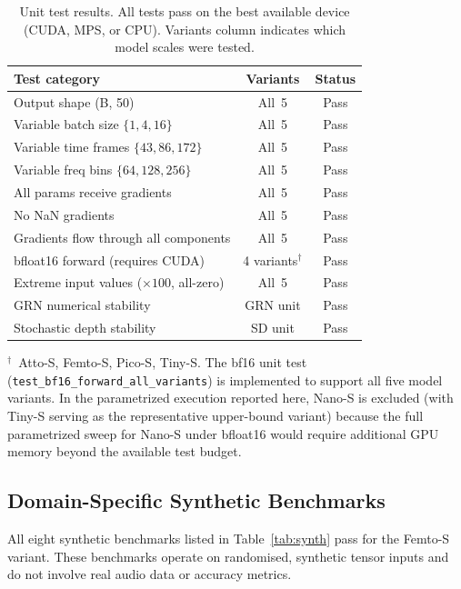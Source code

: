 \documentclass{article}
\newcommand{\passmark}{\textnormal{Pass}}
\begin{document}
\begin{table}[h]
  \centering
  \caption{Unit test results. All tests pass on the best available device
  (CUDA, MPS, or CPU). Variants column indicates which model scales were
  tested.}
  \label{tab:unit_tests}
  \small
  \begin{tabular}{lcc}
  \toprule
  \textbf{Test category} & \textbf{Variants} & \textbf{Status} \\
  \midrule
  Output shape (B, 50) & All~5 & \passmark \\
  Variable batch size $\{1, 4, 16\}$ & All~5 & \passmark \\
  Variable time frames $\{43, 86, 172\}$ & All~5 & \passmark \\
  Variable freq bins $\{64, 128, 256\}$ & All~5 & \passmark \\
  All params receive gradients & All~5 & \passmark \\
  No NaN gradients & All~5 & \passmark \\
  Gradients flow through all components & All~5 & \passmark \\
  bfloat16 forward (requires CUDA) & 4 variants$^\dagger$ & \passmark \\
  Extreme input values ($\times 100$, all-zero) & All~5 & \passmark \\
  GRN numerical stability & GRN unit & \passmark \\
  Stochastic depth stability & SD unit & \passmark \\
  \bottomrule
  \end{tabular}

  \vspace{4pt}
  $^\dagger$\ Atto-S, Femto-S, Pico-S, Tiny-S. The bf16 unit test
  (\texttt{test\_bf16\_forward\_all\_variants}) is implemented to support all
  five model variants. In the parametrized execution reported here, Nano-S is
  excluded (with Tiny-S serving as the representative upper-bound variant)
  because the full parametrized sweep for Nano-S under bfloat16 would require
  additional GPU memory beyond the available test budget.
\end{table}

\subsection{Domain-Specific Synthetic Benchmarks}

All eight synthetic benchmarks listed in Table~\ref{tab:synth} pass for the
Femto-S variant. These benchmarks operate on randomised, synthetic tensor
inputs and do not involve real audio data or accuracy metrics.
\end{document}
